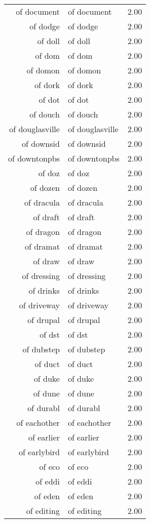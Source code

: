 \begin{table}[ht]
\begin{tabular}{rlr}
  of document & of document & 2.00 \\ 
  of dodge & of dodge & 2.00 \\ 
  of doll & of doll & 2.00 \\ 
  of dom & of dom & 2.00 \\ 
  of domon & of domon & 2.00 \\ 
  of dork & of dork & 2.00 \\ 
  of dot & of dot & 2.00 \\ 
  of douch & of douch & 2.00 \\ 
  of douglasville & of douglasville & 2.00 \\ 
  of downsid & of downsid & 2.00 \\ 
  of downtonpbs & of downtonpbs & 2.00 \\ 
  of doz & of doz & 2.00 \\ 
  of dozen & of dozen & 2.00 \\ 
  of dracula & of dracula & 2.00 \\ 
  of draft & of draft & 2.00 \\ 
  of dragon & of dragon & 2.00 \\ 
  of dramat & of dramat & 2.00 \\ 
  of draw & of draw & 2.00 \\ 
  of dressing & of dressing & 2.00 \\ 
  of drinks & of drinks & 2.00 \\ 
  of driveway & of driveway & 2.00 \\ 
  of drupal & of drupal & 2.00 \\ 
  of dst & of dst & 2.00 \\ 
  of dubstep & of dubstep & 2.00 \\ 
  of duct & of duct & 2.00 \\ 
  of duke & of duke & 2.00 \\ 
  of dune & of dune & 2.00 \\ 
  of durabl & of durabl & 2.00 \\ 
  of eachother & of eachother & 2.00 \\ 
  of earlier & of earlier & 2.00 \\ 
  of earlybird & of earlybird & 2.00 \\ 
  of eco & of eco & 2.00 \\ 
  of eddi & of eddi & 2.00 \\ 
  of eden & of eden & 2.00 \\ 
  of editing & of editing & 2.00 \\ 

\end{tabular}
\end{table}
